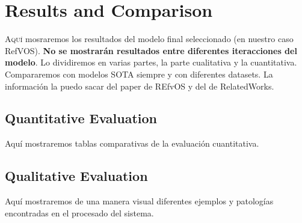 

\chapter{Results and Comparison}\label{cha:results}



\lettrine{A}{quí} mosraremos los resultados del modelo final seleccionado (en
nuestro caso RefVOS). \textbf{No se mostrarán resultados entre diferentes
  iteracciones del modelo}. Lo dividiremos en varias partes, la parte
cualitativa y la cuantitativa. Compararemos con modelos SOTA siempre y con
diferentes datasets. La información la puedo sacar del paper de REfvOS y del de
RelatedWorks.


\section{Quantitative Evaluation}

Aquí mostraremos tablas comparativas de la evaluación cuantitativa.


\section{Qualitative Evaluation}

Aquí mostraremos de una manera visual diferentes ejemplos y patologías
encontradas en el procesado del sistema.
